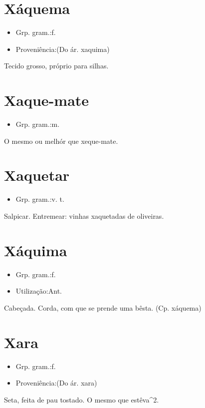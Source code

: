 \section{Xáquema}
\begin{itemize}
\item {Grp. gram.:f.}
\end{itemize}
\begin{itemize}
\item {Proveniência:(Do ár. \textunderscore xaquima\textunderscore )}
\end{itemize}
Tecido grosso, próprio para silhas.
\section{Xaque-mate}
\begin{itemize}
\item {Grp. gram.:m.}
\end{itemize}
O mesmo ou melhór que \textunderscore xeque-mate\textunderscore .
\section{Xaquetar}
\begin{itemize}
\item {Grp. gram.:v. t.}
\end{itemize}
Salpicar.
Entremear: \textunderscore vinhas xaquetadas de oliveiras\textunderscore .
\section{Xáquima}
\begin{itemize}
\item {Grp. gram.:f.}
\end{itemize}
\begin{itemize}
\item {Utilização:Ant.}
\end{itemize}
Cabeçada.
Corda, com que se prende uma bêsta.
(Cp. \textunderscore xáquema\textunderscore )
\section{Xara}
\begin{itemize}
\item {Grp. gram.:f.}
\end{itemize}
\begin{itemize}
\item {Proveniência:(Do ár. \textunderscore xara\textunderscore )}
\end{itemize}
Seta, feita de pau tostado.
O mesmo que \textunderscore estêva\textunderscore ^2.
